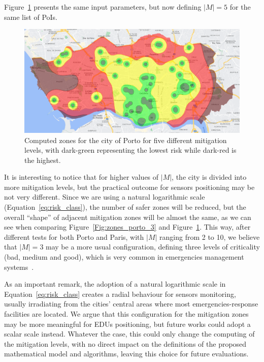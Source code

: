 \begin{refsection}
Figure~\ref{Fig:zones_porto_5} presents the same input parameters, but now defining $|M|=5$ for the same list of PoIs.

\begin{figure}[ht!]
  \centering
  \includegraphics[width=0.9\linewidth]{Chapters/2-EDUs/images/porto_M5_no_weight.png}
  \caption{Computed zones for the city of Porto for five different mitigation levels, with dark-green representing the lowest risk while dark-red is the highest.}\label{Fig:zones_porto_5}
\end{figure}

It is interesting to notice that for higher values of $|M|$, the city is divided into more mitigation levels, but the practical outcome for sensors positioning may be not very different. Since we are using a natural logarithmic scale (Equation~\ref{eq:risk_class}), the number of safer zones will be reduced, but the overall ``shape'' of adjacent mitigation zones will be almost the same, as we can see when comparing Figure~\ref{Fig:zones_porto_3} and Figure~\ref{Fig:zones_porto_5}. This way, after different tests for both Porto and Paris, with $|M|$ ranging from 2 to 10, we believe that $|M|=3$ may be a more usual configuration, defining three levels of criticality (bad, medium and good), which is very common in emergencies management systems~\cite{surveyEmergencies}.

As an important remark, the adoption of a natural logarithmic scale in Equation~\ref{eq:risk_class} creates a radial behaviour for sensors monitoring, usually irradiating from the cities' central areas where most emergencies-response facilities are located. We argue that this configuration for the mitigation zones may be more meaningful for EDUs positioning, but future works could adopt a scalar scale instead. Whatever the case, this could only change the computing of the mitigation levels, with no direct impact on the definitions of the proposed mathematical model and algorithms, leaving this choice for future evaluations.


\end{refsection}
